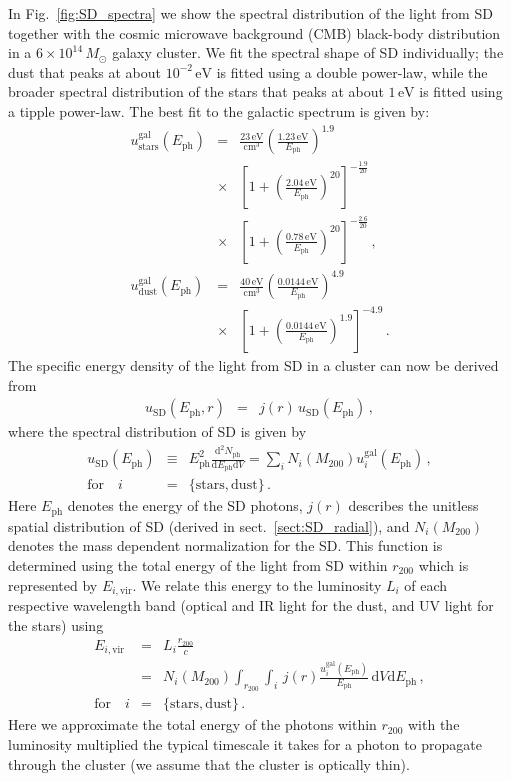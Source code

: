 \documentclass[10pt,aps,pra,reprint,amsmath,amsfonts,amssymb,showpacs,nofootinbib,floatfix]{revtex4-1}
\newcommand{\rmn}{\mathrm}
\newcommand{\ph}{\rmn{ph}}
\newcommand{\eph}{E_\ph}
\newcommand{\vir}{\rmn{vir}}
\newcommand{\gal}{\rmn{gal}}
\newcommand{\sd}{\rmn{SD}}
\newcommand{\msun}{M_\odot}
\newcommand{\stars}{\rmn{stars}}
\newcommand{\dust}{\rmn{dust}}
\newcommand{\ev}{\rmn{eV}}
\newcommand{\dd}{\rmn{d}}
\newcommand{\rvir}{r_{200}}
\newcommand{\mvir}{M_{200}}
\begin{document}
In Fig.~\ref{fig:SD_spectra} we show the spectral distribution of the
light from SD together with the cosmic microwave background (CMB)
black-body distribution in a $6\times10^{14}\,\msun$ galaxy
cluster. We fit the spectral shape of SD individually; the dust that
peaks at about $10^{-2}\,\ev$ is fitted using a double power-law,
while the broader spectral distribution of the stars that peaks at
about $1\,\ev$ is fitted using a tipple power-law. The best fit to the
galactic spectrum is given by:
\begin{eqnarray}
  u_\stars^\gal(\eph) &=& \frac{23\,\rmn{eV}}{\rmn{cm}^3} 
  \left(\frac{1.23\,\rmn{eV}}{\eph}\right)^{1.9} \nonumber \\
  &\times&\left[1+\left(\frac{2.04\,\rmn{eV}}{\eph}\right)^{20}\right]
  ^{-\frac{1.9}{20}}\nonumber \\
  &\times& \left[1+\left(\frac{0.78\,\rmn{eV}}{\eph}\right)^{20}\right]^{-\frac{2.6}{20}}\,, \\
  u_\dust^\gal(\eph) &=& 
  \frac{40\,\rmn{eV}}{\rmn{cm}^3} 
  \left(\frac{0.0144\,\rmn{eV}}{\eph}\right)^{4.9}\nonumber \\
  &\times& \left[1+\left(\frac{0.0144\,\rmn{eV}}{\eph}\right)^{1.9}\right]^{-4.9}\,.
\end{eqnarray}
The specific energy density of the light from SD in a cluster can now
be derived from
\begin{eqnarray} 
u_\sd(\eph, r) &=& j(r)\,u_\sd(\eph)\,,
\label{eq:u_SD_er}
\end{eqnarray}
where the spectral distribution of SD is given by
\begin{eqnarray}
  u_\sd(\eph) &\equiv& \eph^2\frac{\dd^2 N_\ph}{\dd \eph \dd V}
  =  \sum_i N_i(\mvir) u_i^\gal(\eph)\,,\nonumber \\ 
\rmn{for}\quad i&=&\{\rmn{stars,dust}\}\,.
\end{eqnarray}
Here $\eph$ denotes the energy of the SD photons, $j(r)$ describes the
unitless spatial distribution of SD (derived in
sect.~\ref{sect:SD_radial}), and $N_i(\mvir)$ denotes the mass
dependent normalization for the SD. This function is determined using
the total energy of the light from SD within $\rvir$ which is
represented by $E_{i,\vir}$. We relate this energy to the luminosity
$L_i$ of each respective wavelength band (optical and IR light for the
dust, and UV light for the stars) using
\begin{eqnarray} 
  E_{i,\vir} &=& L_i \frac{\rvir}{c} \nonumber \\
  &=&N_i(\mvir)\int_{\rvir} \int_i \,j(r) 
  \frac{u_i^\gal(\eph)}{\eph}\,\dd V\dd \eph\,,\nonumber \\
 \rmn{for}\quad i&=&\{\rmn{stars,dust}\}\,.
\label{eq:E_SD}
\end{eqnarray}
Here we approximate the total energy of the photons within $\rvir$
with the luminosity \cite{2008A&A...490..547G} multiplied the typical
timescale it takes for a photon to propagate through the cluster (we
assume that the cluster is optically thin).
\end{document}
